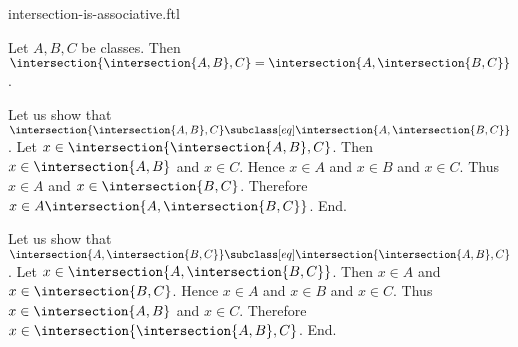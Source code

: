 \documentclass{article}
\begin{document}
\begin{smodule}[creators={Marcel Schütz}]{intersection-is-associative.ftl}

  \begin{fproposition*}[label=3587256308727808]
    Let $A, B, C$ be classes.
    Then $\intersection{\intersection{A,B},C} = \intersection{A,\intersection{B,C}}$.
  \end{fproposition*}
  \begin{fproof}
    Let us show that $\intersection{\intersection{A,B},C} \subclass[eq] \intersection{A,\intersection{B,C}}$.
      Let $x \in \intersection{\intersection{A,B},C}$.
      Then $x \in \intersection{A,B}$ and $x \in C$.
      Hence $x \in A$ and $x \in B$ and $x \in C$.
      Thus $x \in A$ and $x \in \intersection{B,C}$.
      Therefore$ x \in A \intersection{A,\intersection{B,C}}$.
    End.

    Let us show that $\intersection{A,\intersection{B,C}} \subclass[eq] \intersection{\intersection{A,B},C}$.
      Let $x \in \intersection{A,\intersection{B,C}}$.
      Then $x \in A$ and $x \in \intersection{B,C}$.
      Hence $x \in A$ and $x \in B$ and $x \in C$.
      Thus $x \in \intersection{A,B}$ and $x \in C$.
      Therefore $x \in \intersection{\intersection{A,B},C}$.
    End.
  \end{fproof}
\end{smodule}
\end{document}
